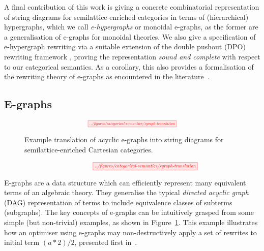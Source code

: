 A final contribution of this work is giving a concrete combinatorial representation of string diagrams for semilattice-enriched categories in terms of (hierarchical)  hypergraphs, which we call \textit{e-hypergraphs} or monoidal e-graphs, as the former are a generalisation of e-graphs for monoidal theories.
We also give a specification of e-hypergraph rewriting via a suitable extension of the double pushout (DPO) rewriting framework 
\cite{dpo, bonchi_string_2022-1,bonchi_string_2022-2,bonchi_string_2022-3},  proving the representation \textit{sound and complete} with respect to our categorical semantics.  
As a corollary, this also provides a formalisation of the rewriting theory of e-graphs as encountered in the literature~\cite{EggPaper}.

\subsection{E-graphs}

\ifdefined \ONECOLUMN
\begin{figure}
	\[
		\scalebox{0.55}{
		\tikzfig{../figures/categorical-semantics/egraph-translation}
		}
	\]
	\caption{Example translation of acyclic e-graphs into string diagrams for semilattice-enriched Cartesian categories. }
	\label{fig:e-graph-example}
	\end{figure}
\else
\begin{figure*}
\[
	\hspace{1.3cm}
    \scalebox{0.65}{
    \tikzfig{../figures/categorical-semantics/egraph-translation}
    }
\]
\caption{Example translation of acyclic e-graphs into string diagrams for semilattice-enriched Cartesian categories. }
\label{fig:e-graph-example}
\end{figure*}
\fi

E-graphs are a data structure which can efficiently represent many equivalent terms of an algebraic theory.
They generalise the typical \emph{directed acyclic graph} (DAG) representation of terms to include equivalence classes of subterms (subgraphs).
The key concepts of e-graphs can be intuitively grasped from some simple (but non-trivial) examples, as shown in Figure~\ref{fig:e-graph-example}.
This example illustrates how an optimiser using e-graphs may non-destructively apply a set of rewrites to initial term $(a * 2) / 2$, presented first in~\cite{EggPaper}.

